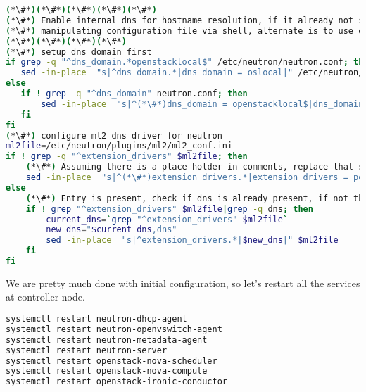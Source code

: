 \begin{lstlisting}[language=bash,keywords={}]
(*\#*)(*\#*)(*\#*)(*\#*)(*\#*)
(*\#*) Enable internal dns for hostname resolution, if it already not set
(*\#*) manipulating configuration file via shell, alternate is to use openstack-config (TODO)
(*\#*)(*\#*)(*\#*)(*\#*)
(*\#*) setup dns domain first
if grep -q "^dns_domain.*openstacklocal$" /etc/neutron/neutron.conf; then
   sed -in-place  "s|^dns_domain.*|dns_domain = oslocal|" /etc/neutron/neutron.conf
else
   if ! grep -q "^dns_domain" neutron.conf; then
       sed -in-place  "s|^(*\#*)dns_domain = openstacklocal$|dns_domain = oslocal|" /etc/neutron/neutron.conf
   fi
fi
(*\#*) configure ml2 dns driver for neutron
ml2file=/etc/neutron/plugins/ml2/ml2_conf.ini
if ! grep -q "^extension_drivers" $ml2file; then
    (*\#*) Assuming there is a place holder in comments, replace that string
    sed -in-place  "s|^(*\#*)extension_drivers.*|extension_drivers = port_security,dns|" $ml2file
else
    (*\#*) Entry is present, check if dns is already present, if not then enable
    if ! grep "^extension_drivers" $ml2file|grep -q dns; then
        current_dns=`grep "^extension_drivers" $ml2file`
        new_dns="$current_dns,dns"
        sed -in-place  "s|^extension_drivers.*|$new_dns|" $ml2file
    fi
fi
\end{lstlisting}

We are pretty much done with initial configuration, so let’s restart all the services at controller node.

\begin{lstlisting}[language=bash,keywords={}]
systemctl restart neutron-dhcp-agent
systemctl restart neutron-openvswitch-agent
systemctl restart neutron-metadata-agent
systemctl restart neutron-server
systemctl restart openstack-nova-scheduler
systemctl restart openstack-nova-compute
systemctl restart openstack-ironic-conductor
\end{lstlisting}

